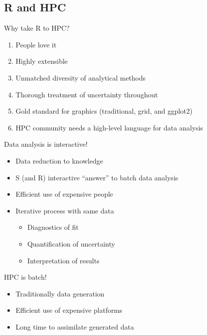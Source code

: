 \subsection{R and HPC}


\begin{frame}
  \begin{block}{Why take R to HPC?}
    \pause
    \begin{enumerate}[<+-|alert@+>]
      \item People love it
      \item Highly extensible
      \item Unmatched diversity of analytical methods
      \item Thorough treatment of uncertainty throughout
      \item Gold standard for graphics (traditional, grid, and ggplot2)
      \item HPC community needs a high-level language for data analysis
    \end{enumerate}
  \end{block}
\end{frame}

\begin{frame}
  \begin{block}{Data analysis is interactive!}
    \pause
    \begin{itemize}[<+-|alert@+>]
    \item Data reduction to knowledge
    \item S (and R) interactive ``answer'' to batch data analysis
    \item Efficient use of expensive people
    \item Iterative process with same data
      \begin{itemize}
      \item Diagnostics of fit
      \item Quantification of uncertainty
      \item Interpretation of results
      \end{itemize}
    \end{itemize}
  \end{block}
  \begin{block}{HPC is batch!}
    \pause
    \begin{itemize}[<+-|alert@+>]
    \item Traditionally data generation
    \item Efficient use of expensive platforms
    \item Long time to assimilate generated data
    \end{itemize}
  \end{block}
\end{frame}



